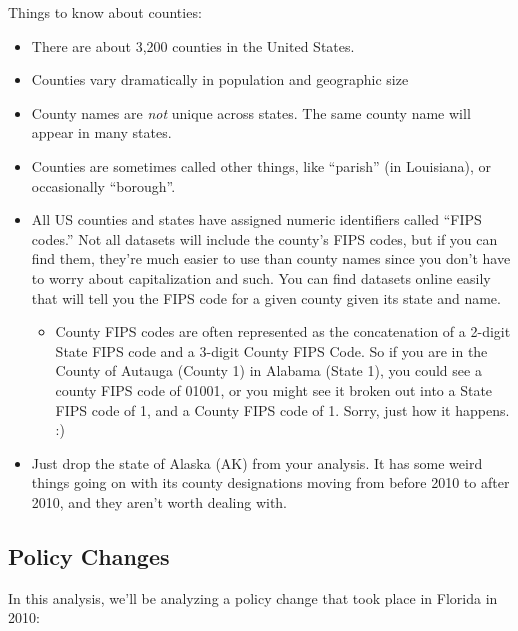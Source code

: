 \documentclass[12pt]{article}
\begin{document}
Things to know about counties:

\begin{itemize}
  \item There are about 3,200 counties in the United States.
  \item Counties vary dramatically in population and geographic size
  \item County names are \emph{not} unique across states. The same county name will appear in many states.
  \item Counties are sometimes called other things, like ``parish'' (in Louisiana), or occasionally ``borough''.
  \item All US counties and states have assigned numeric identifiers called ``FIPS codes.'' Not all datasets will include the county's FIPS codes, but if you can find them, they're much easier to use than county names since you don't have to worry about capitalization and such. You can find datasets online easily that will tell you the FIPS code for a given county given its state and name.
  \begin{itemize}
    \item County FIPS codes are often represented as the concatenation of a 2-digit State FIPS code and a 3-digit County FIPS Code. So if you are in the County of Autauga (County 1) in Alabama (State 1), you could see a county FIPS code of 01001, or you might see it broken out into a State FIPS code of 1, and a County FIPS code of 1. Sorry, just how it happens. :)
  \end{itemize}
  \item Just drop the state of Alaska (AK) from your analysis. It has some weird things going on with its county designations moving from before 2010 to after 2010, and they aren't worth dealing with.
\end{itemize}

\subsection*{Policy Changes}

In this analysis, we'll be analyzing a policy change that took place in Florida in 2010:
\end{document}
